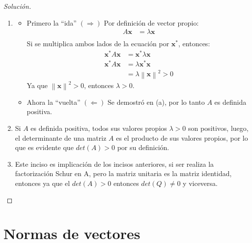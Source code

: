 \documentclass[12pt]{book}
\newcommand\norm[1]{\left\lVert#1\right\rVert}
\newenvironment{solucion}
  {\renewcommand\qedsymbol{$\square$}\begin{proof}[Solución]}
  {\end{proof}}
\begin{document}
\begin{solucion}
\begin{enumerate}
    \item 
        \begin{itemize}
            \item Primero la ``ida'' $(\Rightarrow)$
                Por definición de vector propio:
                \begin{align*}
                    A\bm{x}&=\lambda \bm{x}\\
                \end{align*}
                Si se multiplica ambos lados de la ecuación por $\bm{x}^*$, entonces:
                \begin{align*}
                    \bm{x}^*A\bm{x}&=\bm{x}^*\lambda \bm{x}\\
                    \bm{x}^*A\bm{x}&=\lambda \bm{x}^*\bm{x}\\
                    &=\lambda\norm{\bm{x}}^2>0
                \end{align*}
                Ya que $\norm{\bm{x}}^2>0$, entonces $\lambda>0$.
            \item Ahora la ``vuelta'' $(\Leftarrow)$
                Se demostró en (a), por lo tanto $A$ es definida positiva.
        \end{itemize}
    \item Si $A$ es definida positiva, todos sus valores propios $\lambda>0$ son positivos, luego, el determinante de una matriz $A$ es el producto de sus valores propios, por lo que es evidente que $det(A)>0$ por su definición.
    \item Este inciso es implicación de los incisos anteriores, si ser realiza la factorización Schur en A, pero la matriz unitaria es la matriz identidad, entonces ya que el $det(A)>0$ entonces $det(Q)\neq 0$ y viceversa.
\end{enumerate}
\end{solucion}

\section{Normas de vectores}
\end{document}
